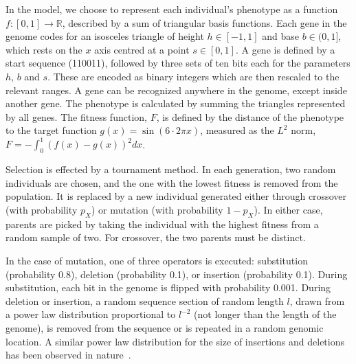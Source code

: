 \documentclass[10pt]{article}
\renewcommand{\paragraph}[1]{\textbf{#1}\hspace{2ex}}
\renewcommand{\paragraph}[1]{}
\begin{document}
\paragraph{Geno- and phenotypes} In the model, we choose to represent each
individual's phenotype as a function $f:
[0,1]\rightarrow \mathbb{R}$, described by a sum of
triangular basis functions. Each gene in the genome codes for an isosceles
triangle of height $h\in[-1,1]$ and base $b\in(0,1]$, which rests on the $x$
axis centred at a point $s\in[0,1]$. A gene is defined by a start sequence
(110011), followed by three sets of ten bits each for the
parameters $h$, $b$ and $s$. These are encoded as binary integers which are then
rescaled to the relevant ranges. A gene can be recognized
anywhere in the genome, except inside another gene. The phenotype is
calculated by summing the triangles represented by all genes. The
fitness function, $F$, is defined by the distance of the phenotype to the target
function $g(x) = \sin(6\cdot 2\pi x)$, measured as the $L^2$ norm,
$F = -\int_0^1{(f(x)-g(x))^2}dx$.

\paragraph{What about the sign of the fitness? In the above it is positive.
Call it a cost and change fig 3?}

\paragraph{Selection method}
Selection is effected by a tournament method. In each generation, two random
individuals are chosen, and the one with the lowest fitness is removed from
the population. It is replaced by a new individual generated either
through crossover (with probability $p_X$) or mutation (with probability $1-p_X$).
In either case, parents are picked by taking the individual with the highest
fitness from a random sample of two. For crossover, the two parents must be
distinct.

\paragraph{Mutation} In the case of mutation, one of three operators is
executed: substitution (probability 0.8), deletion (probability 0.1), or
insertion (probability 0.1). During substitution, each bit in the genome is
flipped with probability 0.001. During deletion or insertion, a random
sequence section of random length $l$, drawn from a power law distribution
proportional to $l^{-2}$ (not longer than the length of the genome), is
removed from the sequence or is repeated in a random genomic location. A
similar power law distribution for the size of insertions and deletions has
been observed in nature~\cite{cartwright2009}.
\end{document}
